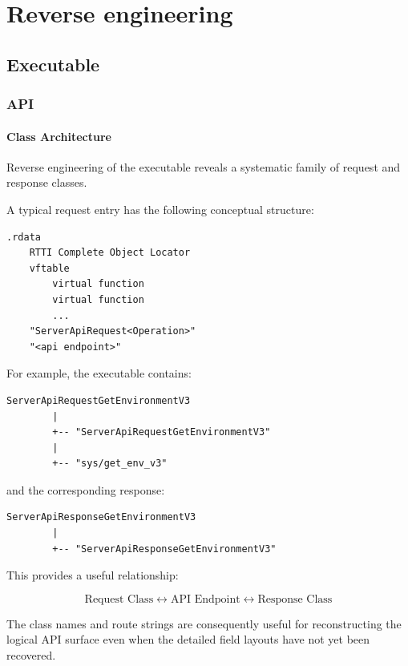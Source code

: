 \section{Reverse engineering}

\subsection{Executable}

\subsubsection{API}

\paragraph{Class Architecture}

Reverse engineering of the executable reveals a systematic family of
request and response classes.

A typical request entry has the following conceptual structure:

\begin{lstlisting}
.rdata
    RTTI Complete Object Locator
    vftable
        virtual function
        virtual function
        ...
    "ServerApiRequest<Operation>"
    "<api endpoint>"
\end{lstlisting}

For example, the executable contains:

\begin{lstlisting}
ServerApiRequestGetEnvironmentV3
        |
        +-- "ServerApiRequestGetEnvironmentV3"
        |
        +-- "sys/get_env_v3"
\end{lstlisting}

and the corresponding response:

\begin{lstlisting}
ServerApiResponseGetEnvironmentV3
        |
        +-- "ServerApiResponseGetEnvironmentV3"
\end{lstlisting}

This provides a useful relationship:

\begin{equation}
\text{Request Class}
\longleftrightarrow
\text{API Endpoint}
\longleftrightarrow
\text{Response Class}
\end{equation}

The class names and route strings are consequently useful for reconstructing
the logical API surface even when the detailed field layouts have not yet
been recovered.

